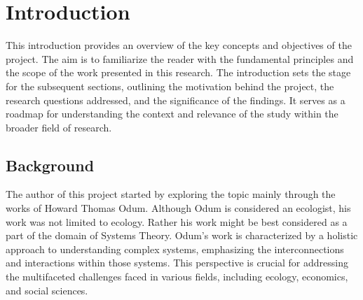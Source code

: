 


\section{Introduction}
\label{sec:introduction}

This introduction provides an overview of the key concepts and objectives of the project. The aim is to familiarize the reader with the fundamental principles and the scope of the work presented in this research. The introduction sets the stage for the subsequent sections, outlining the motivation behind the project, the research questions addressed, and the significance of the findings. It serves as a roadmap for understanding the context and relevance of the study within the broader field of research.

\subsection{Background}
\label{subsec:background}

The author of this project started by exploring the topic mainly through the works of Howard Thomas Odum. Although Odum is considered an ecologist, his work was not limited to ecology. Rather his work might be best considered as a part of the domain of Systems Theory. Odum's work is characterized by a holistic approach to understanding complex systems, emphasizing the interconnections and interactions within those systems. This perspective is crucial for addressing the multifaceted challenges faced in various fields, including ecology, economics, and social sciences. 